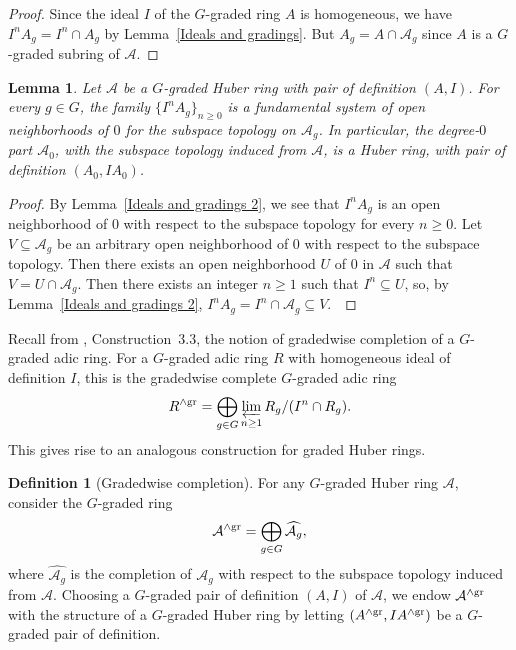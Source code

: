 \documentclass[12pt,twoside,a4paper]{article}
\newtheorem{lemma}[thm]{Lemma}
\theoremstyle{definition}
\newtheorem{mydef}[thm]{Definition}
\theoremstyle{remark}
\newcommand\gr{{\rm gr}}
\begin{document}
\begin{proof}Since the ideal $I$ of the $G$-graded ring $A$ is homogeneous, we have $I^{n}A_{g}=I^{n}\cap A_{g}$ by Lemma~\ref{Ideals and gradings}. But $A_{g}=A\cap \mathcal{A}_{g}$ since $A$ is a $G$-graded subring of $\mathcal{A}$. \end{proof}
\begin{lemma}\label{Degree-0 part}Let $\mathcal{A}$ be a $G$-graded Huber ring with pair of definition $(A, I)$. For every $g\in G$, the family $\{I^{n}A_{g}\}_{n\geq0}$ is a fundamental system of open neighborhoods of $0$ for the subspace topology on $\mathcal{A}_{g}$. 
In particular, the degree-$0$ part $\mathcal{A}_{0}$, with the subspace topology induced from $\mathcal{A}$, is a Huber ring, with pair of definition $(A_{0}, IA_{0})$. \end{lemma}
\begin{proof}By Lemma~\ref{Ideals and gradings 2}, we see that $I^{n}A_{g}$ is an open neighborhood of $0$ with respect to the subspace topology for every $n\geq0$. Let $V\subseteq \mathcal{A}_{g}$ be an arbitrary open neighborhood of $0$ with respect to the subspace topology. Then there exists an open neighborhood $U$ of $0$ in $\mathcal{A}$ such that $V=U\cap \mathcal{A}_{g}$. Then there exists an integer $n\geq1$ such that $I^{n}\subseteq U$, so, by Lemma~\ref{Ideals and gradings 2}, $I^{n}A_{g}=I^{n}\cap \mathcal{A}_{g}\subseteq V$. \end{proof}
Recall from \cite{Ishizuka-Yoshikawa25}, Construction~3.3, the notion of gradedwise completion of a $G$-graded adic ring. For a $G$-graded adic ring $R$ with homogeneous ideal of definition $I$, this is the gradedwise complete $G$-graded adic ring \begin{equation*}R^{\wedge\gr}=\bigoplus_{g\in G}\varprojlim_{n\geq1}R_{g}/(I^{n}\cap R_{g}).\end{equation*}This gives rise to an analogous construction for graded Huber rings. 
\begin{mydef}[Gradedwise completion]\label{Gradedwise completion, definition}For any $G$-graded Huber ring $\mathcal{A}$, consider the $G$-graded ring \begin{equation*}\mathcal{A}^{\wedge\gr}=\bigoplus_{g\in G}\widehat{\mathcal{A}_{g}},\end{equation*}where $\widehat{\mathcal{A}_{g}}$ is the completion of $\mathcal{A}_{g}$ with respect to the subspace topology induced from $\mathcal{A}$. Choosing a $G$-graded pair of definition $(A, I)$ of $\mathcal{A}$, we endow $\mathcal{A}^{\wedge\gr}$ with the structure of a $G$-graded Huber ring by letting $(A^{\wedge\gr}, IA^{\wedge\gr})$ be a $G$-graded pair of definition. \end{mydef}
\end{document}
